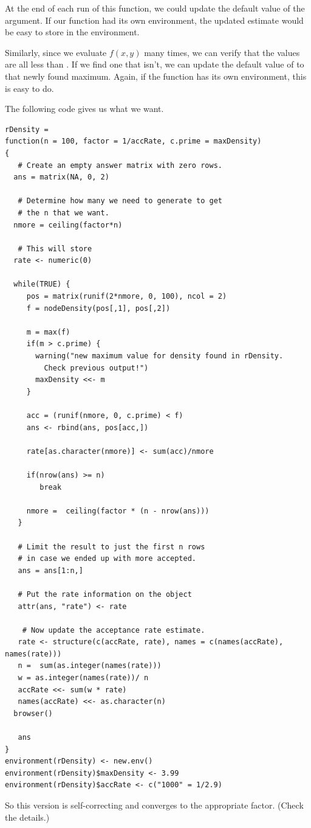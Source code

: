 At the end of each run of this function, we could update the default
value of the  argument.  If our function had its own
environment, the updated estimate would be easy to store in the
environment.

Similarly, since we evaluate $f(x, y)$ many times, we can verify that
the values are all less than .  If we find one that
isn't, we can update the default value of  to that newly
found maximum.  Again, if the function has its own environment, this
is easy to do.

The following code gives us what we want.
{\footnotesize{
\begin{verbatim}
rDensity =
function(n = 100, factor = 1/accRate, c.prime = maxDensity)
{
   # Create an empty answer matrix with zero rows.
  ans = matrix(NA, 0, 2)

   # Determine how many we need to generate to get
   # the n that we want. 
  nmore = ceiling(factor*n)

   # This will store 
  rate <- numeric(0)
  
  while(TRUE) {
     pos = matrix(runif(2*nmore, 0, 100), ncol = 2)
     f = nodeDensity(pos[,1], pos[,2])
     
     m = max(f)
     if(m > c.prime) { 
       warning("new maximum value for density found in rDensity. 
         Check previous output!")
       maxDensity <<- m
     }

     acc = (runif(nmore, 0, c.prime) < f)
     ans <- rbind(ans, pos[acc,])

     rate[as.character(nmore)] <- sum(acc)/nmore
     
     if(nrow(ans) >= n)
        break

     nmore =  ceiling(factor * (n - nrow(ans)))
   }

   # Limit the result to just the first n rows
   # in case we ended up with more accepted.
   ans = ans[1:n,]

   # Put the rate information on the object
   attr(ans, "rate") <- rate

    # Now update the acceptance rate estimate.
   rate <- structure(c(accRate, rate), names = c(names(accRate), names(rate)))
   n =  sum(as.integer(names(rate)))
   w = as.integer(names(rate))/ n
   accRate <<- sum(w * rate)
   names(accRate) <<- as.character(n)
  browser()

   ans
}
environment(rDensity) <- new.env()
environment(rDensity)$maxDensity <- 3.99
environment(rDensity)$accRate <- c("1000" = 1/2.9)
\end{verbatim}
}}

So this version is self-correcting and converges to the appropriate factor.
(Check the details.)
